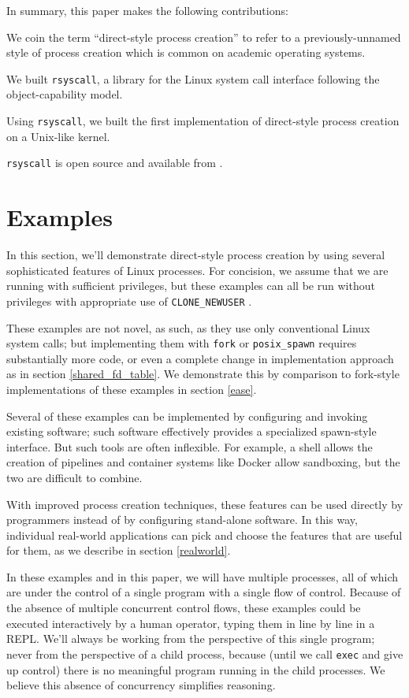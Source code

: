 \documentclass[letterpaper,twocolumn,10pt]{article}
\begin{document}
In summary, this paper makes the following contributions:
\begin{compactitem}
\item We coin the term ``direct-style process creation''
  to refer to a previously-unnamed style of process creation which is common on academic operating systems.
\item We built \texttt{rsyscall}, a library for the Linux system call interface following the object-capability model.
\item Using \texttt{rsyscall}, we built the first implementation of direct-style process creation on a Unix-like kernel.
\end{compactitem}
\texttt{rsyscall} is open source and available from \githuburl{}.
\section{Examples}\label{examples}
In this section,
we'll demonstrate direct-style process creation
by using several sophisticated features of Linux processes.
For concision, we assume that we are running with sufficient privileges,
but these examples can all be run without privileges with appropriate use of \verb|CLONE_NEWUSER|
\cite{user_namespaces}\cite{unpriv_fuse}.

These examples are not novel, as such, as they use only conventional Linux system calls;
but implementing them with \texttt{fork} or \verb|posix_spawn| requires substantially more code,
or even a complete change in implementation approach as in section \ref{shared_fd_table}.
We demonstrate this by comparison to fork-style implementations of these examples in section \ref{ease}.

Several of these examples can be implemented by configuring and invoking existing software;
such software effectively provides a specialized spawn-style interface.
But such tools are often inflexible.
For example, a shell allows the creation of pipelines and container systems like Docker allow sandboxing,
but the two are difficult to combine\cite{docker_pipe}.

With improved process creation techniques,
these features can be used directly by programmers
instead of by configuring stand-alone software.
In this way,
individual real-world applications can pick and choose the features that are useful for them,
as we describe in section \ref{realworld}.

In these examples and in this paper,
we will have multiple processes,
all of which are under the control of a single program with a single flow of control.
Because of the absence of multiple concurrent control flows,
these examples could be executed interactively by a human operator,
typing them in line by line in a REPL.
We'll always be working from the perspective of this single program;
never from the perspective of a child process, because (until we call \texttt{exec} and give up control)
there is no meaningful program running in the child processes.
We believe this absence of concurrency simplifies reasoning.
\end{document}
